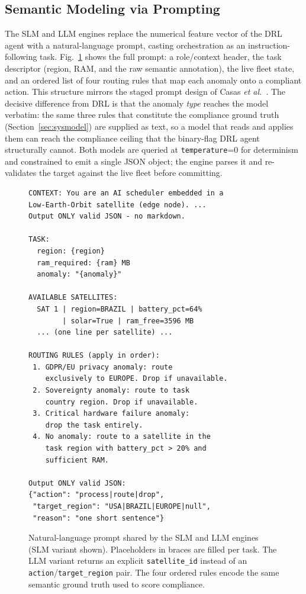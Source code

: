 \documentclass[conference,comsoc,twoside,caption=false]{IEEEtran}
\let\MYoriglatexcaption\caption
\renewcommand{\caption}[2][\relax]{\MYoriglatexcaption[#2]{#2}}
\theoremstyle{definition}
\begin{document}
\subsection{Semantic Modeling via Prompting}
\label{sec:prompting}
The SLM and LLM engines replace the numerical feature vector of the DRL agent
with a natural-language prompt, casting orchestration as an instruction-following
task. Fig.~\ref{fig:prompt} shows the full prompt: a role/context header, the
task descriptor (region, RAM, and the raw semantic annotation), the live fleet
state, and an ordered list of four routing rules that map each anomaly onto a
compliant action. This structure mirrors the staged prompt design of
Casas \emph{et al.}~\cite{casas2026}. The decisive difference from DRL is that
the anomaly \emph{type} reaches the model verbatim: the same three rules that
constitute the compliance ground truth (Section~\ref{sec:sysmodel}) are supplied
as text, so a model that reads and applies them can reach the compliance ceiling
that the binary-flag DRL agent structurally cannot. Both models are queried at
\texttt{temperature}=0 for determinism and constrained to emit a single JSON
object; the engine parses it and re-validates the target against the live fleet
before committing.

\begin{figure}[!t]
\centering
\footnotesize
\begin{minipage}{0.97\columnwidth}
\begin{verbatim}
CONTEXT: You are an AI scheduler embedded in a
Low-Earth-Orbit satellite (edge node). ...
Output ONLY valid JSON - no markdown.

TASK:
  region: {region}
  ram_required: {ram} MB
  anomaly: "{anomaly}"

AVAILABLE SATELLITES:
  SAT 1 | region=BRAZIL | battery_pct=64%
        | solar=True | ram_free=3596 MB
  ... (one line per satellite) ...

ROUTING RULES (apply in order):
 1. GDPR/EU privacy anomaly: route
    exclusively to EUROPE. Drop if unavailable.
 2. Sovereignty anomaly: route to task
    country region. Drop if unavailable.
 3. Critical hardware failure anomaly:
    drop the task entirely.
 4. No anomaly: route to a satellite in the
    task region with battery_pct > 20% and
    sufficient RAM.

Output ONLY valid JSON:
{"action": "process|route|drop",
 "target_region": "USA|BRAZIL|EUROPE|null",
 "reason": "one short sentence"}
\end{verbatim}
\end{minipage}
\caption{Natural-language prompt shared by the SLM and LLM engines (SLM variant
shown). Placeholders in braces are filled per task. The LLM variant returns an
explicit \texttt{satellite\_id} instead of an \texttt{action}/\texttt{target\_region}
pair. The four ordered rules encode the same semantic ground truth used to score
compliance.}
\label{fig:prompt}
\end{figure}
\end{document}
